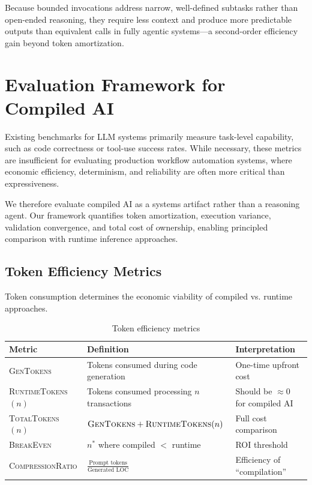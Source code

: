 \documentclass[11pt]{article}
\newcommand{\metric}[1]{\textsc{#1}}
\begin{document}
Because bounded invocations address narrow, well-defined subtasks rather than open-ended reasoning, they require less context and produce more predictable outputs than equivalent calls in fully agentic systems---a second-order efficiency gain beyond token amortization.

\section{Evaluation Framework for Compiled AI}
\label{sec:framework}

Existing benchmarks for LLM systems primarily measure task-level capability, such as code correctness or tool-use success rates. While necessary, these metrics are insufficient for evaluating production workflow automation systems, where economic efficiency, determinism, and reliability are often more critical than expressiveness.

We therefore evaluate compiled AI as a systems artifact rather than a reasoning agent. Our framework quantifies token amortization, execution variance, validation convergence, and total cost of ownership, enabling principled comparison with runtime inference approaches.

\subsection{Token Efficiency Metrics}

Token consumption determines the economic viability of compiled vs. runtime approaches.

\begin{table}[ht]
\centering
\caption{Token efficiency metrics}
\label{tab:token-metrics}
\begin{tabular}{p{3.5cm}p{4cm}p{4.5cm}}
\toprule
Metric & Definition & Interpretation \\
\midrule
\metric{GenTokens} & Tokens consumed during code generation & One-time upfront cost \\
\metric{RuntimeTokens}$(n)$ & Tokens consumed processing $n$ transactions & Should be $\approx 0$ for compiled AI \\
\metric{TotalTokens}$(n)$ & $\text{\metric{GenTokens}} + \text{\metric{RuntimeTokens}}(n)$ & Full cost comparison \\
\metric{BreakEven} & $n^*$ where compiled $<$ runtime & ROI threshold \\
\metric{CompressionRatio} & $\frac{\text{Prompt tokens}}{\text{Generated LOC}}$ & Efficiency of ``compilation'' \\
\bottomrule
\end{tabular}
\end{table}
\end{document}
